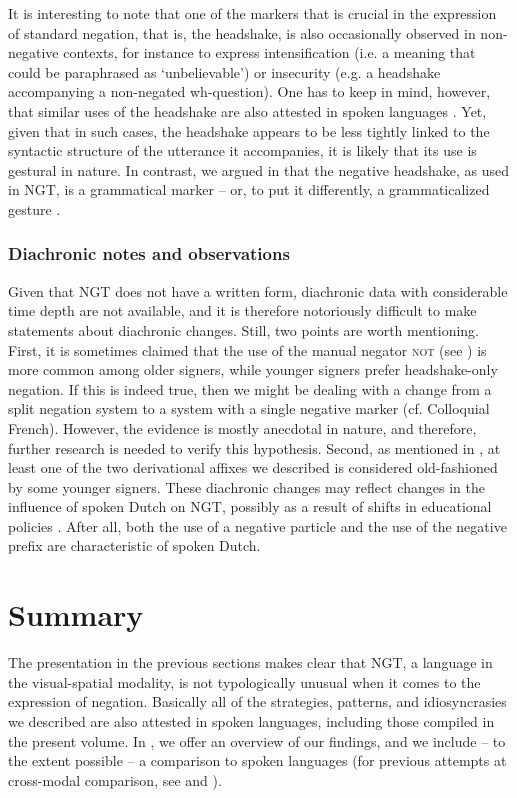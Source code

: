 \documentclass[output=paper,colorlinks,citecolor=brown]{langscibook}
\begin{document}
It is interesting to note that one of the markers that is crucial in the expression of standard negation, that is, the headshake, is also occasionally observed in non-negative contexts, for instance to express intensification (i.e. a meaning that could be paraphrased as `unbelievable') or insecurity (e.g. a headshake accompanying a non-negated wh-question). One has to keep in mind, however, that similar uses of the headshake are also attested in spoken languages \citep{McClave2000,Kendon2002}. Yet, given that in such cases, the headshake appears to be less tightly linked to the syntactic structure of the utterance it accompanies, it is likely that its use is gestural in nature. In contrast, we argued in  that the negative headshake, as used in NGT, is a grammatical marker -- or, to put it differently, a grammaticalized gesture \citep[cf.][]{LoonEtAl2014,Pfau2015}. 

\subsubsection{Diachronic notes and observations}

Given that NGT does not have a written form, diachronic data with considerable time depth are not available, and it is therefore notoriously difficult to make statements about diachronic changes. Still, two points are worth mentioning. First, it is sometimes claimed that the use of the manual negator \textsc{not} (see ) is more common among older signers, while younger signers prefer headshake-only negation. If this is indeed true, then we might be dealing with a change from a split negation system to a system with a single negative marker (cf. Colloquial French). However, the evidence is mostly anecdotal in nature, and therefore, further research is needed to verify this hypothesis. Second, as mentioned in , at least one of the two derivational affixes we described is considered old-fashioned by some younger signers. These diachronic changes may reflect changes in the influence of spoken Dutch on NGT, possibly as a result of shifts in educational policies \citep[see][]{Klomp2021}. After all, both the use of a negative particle and the use of the negative prefix are characteristic of spoken Dutch.

\section{Summary}
\largerpage[2]
The presentation in the previous sections makes clear that NGT, a language in the visual-spatial modality, is not typologically unusual when it comes to the expression of negation. Basically all of the strategies, patterns, and idiosyncrasies we described are also attested in spoken languages, including those compiled in the present volume. In , we offer an overview of our findings, and we include -- to the extent possible -- a comparison to spoken languages (for previous attempts at cross-modal comparison, see \citealt{Pfau2002,Pfau2015} and \citealt{Gokgoz2021}).
\end{document}
